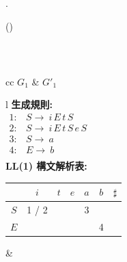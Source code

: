 \documentclass[dvipdfmx,a4j]{jarticle}
\newcounter{coffee}
\newcounter{bean}
\begin{document}
\begin{list}{.}{}
\begin{list}{()}{}
\begin{center}
\begin{tabularx}{.8\linewidth}{XX}
                  \end{tabularx}
                \end{center}
          \item\ \\
                \begin{tabular}{cc}
                  $G_1$                                         & $G'_1$ \\
                  \begin{tabular}{l}
                    {\bf 生成規則:}                                \\
                    $\begin{array}{cl}
                         1: & S \rightarrow\ i\, E\, t\, S         \\
                         2: & S \rightarrow\ i\, E\, t\, S\, e\, S \\
                         3: & S \rightarrow\ a                     \\
                         4: & E \rightarrow\ b                     \\
                       \end{array}$ \\[10pt]
                    {\bf LL(1) 構文解析表:}                         \\
                    \begin{tabular}{c|cccccc}
                          & $i$   & $t$ & $e$ & $a$ & $b$ & $\sharp$ \\ \hline
                      $S$ & 1 / 2 &     &     & 3   &     &          \\
                      $E$ &       &     &     &     & 4   &
                    \end{tabular}
                  \end{tabular} &
\end{tabular}
\end{list}
\end{list}
\end{document}
